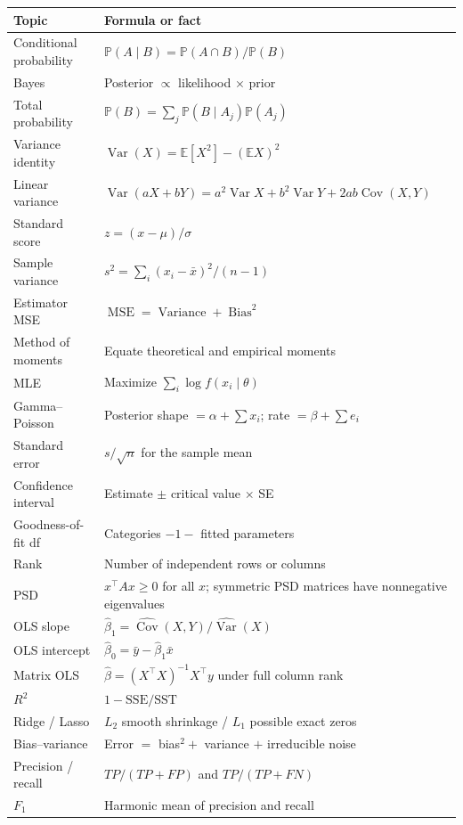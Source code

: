 \documentclass[10pt,a4paper]{article}
\newcommand{\E}{\mathbb{E}}
\newcommand{\Var}{\operatorname{Var}}
\newcommand{\Cov}{\operatorname{Cov}}
\newcommand{\Prob}{\mathbb{P}}
\begin{document}
\small
\begin{longtable}{@{}p{39mm}p{117mm}@{}}
\toprule
Topic & Formula or fact \\
\midrule
\endhead
Conditional probability & $\Prob(A\mid B)=\Prob(A\cap B)/\Prob(B)$ \\
Bayes & Posterior $\propto$ likelihood $\times$ prior \\
Total probability & $\Prob(B)=\sum_j\Prob(B\mid A_j)\Prob(A_j)$ \\
Variance identity & $\Var(X)=\E[X^2]-(\E X)^2$ \\
Linear variance & $\Var(aX+bY)=a^2\Var X+b^2\Var Y+2ab\Cov(X,Y)$ \\
Standard score & $z=(x-\mu)/\sigma$ \\
Sample variance & $s^2=\sum_i(x_i-\bar x)^2/(n-1)$ \\
Estimator MSE & $\operatorname{MSE}=\operatorname{Variance}+\operatorname{Bias}^2$ \\
Method of moments & Equate theoretical and empirical moments \\
MLE & Maximize $\sum_i\log f(x_i\mid\theta)$ \\
Gamma--Poisson & Posterior shape $=\alpha+\sum x_i$; rate $=\beta+\sum e_i$ \\
Standard error & $s/\sqrt n$ for the sample mean \\
Confidence interval & Estimate $\pm$ critical value $\times$ SE \\
Goodness-of-fit df & Categories $-1-$ fitted parameters \\
Rank & Number of independent rows or columns \\
PSD & $x^\top Ax\ge0$ for all $x$; symmetric PSD matrices have nonnegative eigenvalues \\
OLS slope & $\hat\beta_1=\widehat{\Cov}(X,Y)/\widehat{\Var}(X)$ \\
OLS intercept & $\hat\beta_0=\bar y-\hat\beta_1\bar x$ \\
Matrix OLS & $\hat\beta=(X^\top X)^{-1}X^\top y$ under full column rank \\
$R^2$ & $1-\mathrm{SSE}/\mathrm{SST}$ \\
Ridge / Lasso & $L_2$ smooth shrinkage / $L_1$ possible exact zeros \\
Bias--variance & Error $=$ bias$^2+$ variance $+$ irreducible noise \\
Precision / recall & $TP/(TP+FP)$ and $TP/(TP+FN)$ \\
$F_1$ & Harmonic mean of precision and recall \\

\end{longtable}
\end{document}
